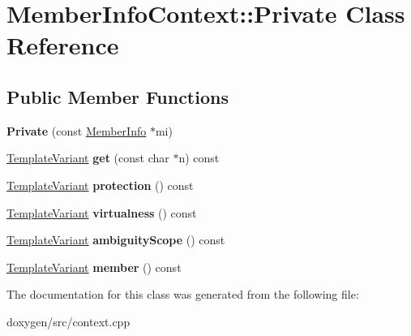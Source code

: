 \hypertarget{class_member_info_context_1_1_private}{}\section{Member\+Info\+Context\+::Private Class Reference}
\label{class_member_info_context_1_1_private}
\subsection*{Public Member Functions}
\begin{DoxyCompactItemize}
\item 
\mbox{\label{class_member_info_context_1_1_private_a200c99bbbd9049464b7f2e8e4b3a4597}} 
{\bfseries Private} (const \mbox{\hyperlink{struct_member_info}{Member\+Info}} $\ast$mi)
\item 
\mbox{\label{class_member_info_context_1_1_private_aa816b0b5f00fd3d7f2c27ca77892e0de}} 
\mbox{\hyperlink{class_template_variant}{Template\+Variant}} {\bfseries get} (const char $\ast$n) const
\item 
\mbox{\label{class_member_info_context_1_1_private_aad872d50e2f3860849360f8c9349a316}} 
\mbox{\hyperlink{class_template_variant}{Template\+Variant}} {\bfseries protection} () const
\item 
\mbox{\label{class_member_info_context_1_1_private_a7eb65cddfd34364ed080ebd113ddb661}} 
\mbox{\hyperlink{class_template_variant}{Template\+Variant}} {\bfseries virtualness} () const
\item 
\mbox{\label{class_member_info_context_1_1_private_a5b0e31d206253c3a1837d6e00f21022c}} 
\mbox{\hyperlink{class_template_variant}{Template\+Variant}} {\bfseries ambiguity\+Scope} () const
\item 
\mbox{\label{class_member_info_context_1_1_private_a91c60634f5743c7939cfdace35553696}} 
\mbox{\hyperlink{class_template_variant}{Template\+Variant}} {\bfseries member} () const
\end{DoxyCompactItemize}


The documentation for this class was generated from the following file\+:\begin{DoxyCompactItemize}
\item 
doxygen/src/context.\+cpp\end{DoxyCompactItemize}
